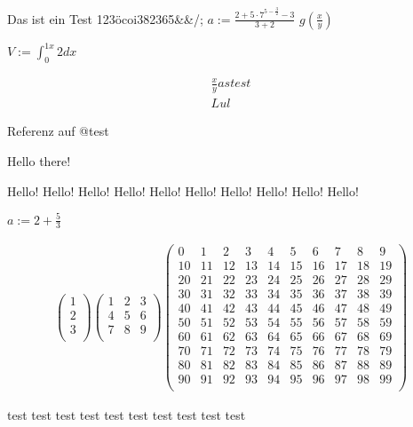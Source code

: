 % 
%

\usepackage{amsmath, test}


\test{}

Das ist ein Test 123öcoi382365&&/;
$a:=\frac{2+{5 \cdot{} 7}^{5-\frac{3}{2}}-3}{3+2}$
$g\left(\frac{x}{y}\right)$

$V := \int_{0}^{1 x}2dx$

\begin{align}
    \frac{x}{y} as test\\
    Lul
\end{align}

Referenz auf @test

Hello there!

Hello!
Hello!
Hello!
Hello!
Hello!
Hello!
Hello!
Hello!
Hello!
Hello!


$a:=2+\frac{5}{3}$

\begin{align}
    \begin{pmatrix}
1\\
2\\
3\\
\end{pmatrix}
\begin{pmatrix}
1 & 2 & 3\\
4 & 5 & 6\\
7 & 8 & 9\\
\end{pmatrix}
\begin{pmatrix}
0 & 1 & 2 & 3 & 4 & 5 & 6 & 7 & 8 & 9\\
10 & 11 & 12 & 13 & 14 & 15 & 16 & 17 & 18 & 19\\
20 & 21 & 22 & 23 & 24 & 25 & 26 & 27 & 28 & 29\\
30 & 31 & 32 & 33 & 34 & 35 & 36 & 37 & 38 & 39\\
40 & 41 & 42 & 43 & 44 & 45 & 46 & 47 & 48 & 49\\
50 & 51 & 52 & 53 & 54 & 55 & 56 & 57 & 58 & 59\\
60 & 61 & 62 & 63 & 64 & 65 & 66 & 67 & 68 & 69\\
70 & 71 & 72 & 73 & 74 & 75 & 76 & 77 & 78 & 79\\
80 & 81 & 82 & 83 & 84 & 85 & 86 & 87 & 88 & 89\\
90 & 91 & 92 & 93 & 94 & 95 & 96 & 97 & 98 & 99\\
\end{pmatrix}

\end{align}





test
test
test
test
test
test
test
test
test
test


%
%
%
%
%
%
%
%
%
%
%